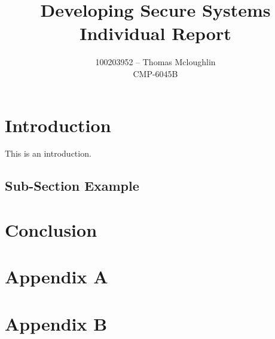 \documentclass{ueacmpstyle}
\begin{document}
	\title{Developing Secure Systems Individual Report}
	\author{
		100203952 -- Thomas Mcloughlin\\
		CMP-6045B
	}
	\maketitle

    \section{Introduction}\label{sec:Intro}
        This is an introduction. 
        
        \subsection{Sub-Section Example}\label{sub:Ex}
        
    \section{Conclusion}\label{sec:Con}
    
    
    \nocite{*}
	
	
	\newpage
	\appendix
        \section{Appendix A}\label{app:A}   %
            \newpage
        \section{Appendix B}\label{app:B}
\end{document}
